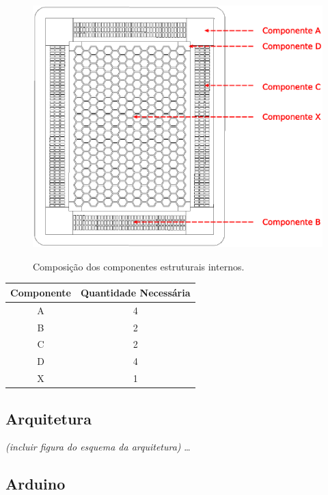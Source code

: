 \documentclass[a4paper,10pt]{article}
\begin{document}
\begin{center}
\begin{figure}[h!]
	\center
	\includegraphics[angle=0, scale=0.70]{./img/componentes.eps}
	\label{componentes}
	\caption{Composição dos componentes estruturais internos.}
\end{figure}
\end{center}

\begin{center}
\begin{tabular}{|c|c|}
\hline 
{\bf Componente} & {\bf Quantidade Necessária} \\ \hline \hline
A & 4 \\ \hline
B & 2 \\ \hline
C & 2 \\ \hline
D & 4 \\ \hline
X & 1 \\ \hline
\end{tabular}
\end{center}

\subsection{Arquitetura}

{\it (incluir figura do esquema da arquitetura)}
\ldots

\subsection{Arduino}
\end{document}
